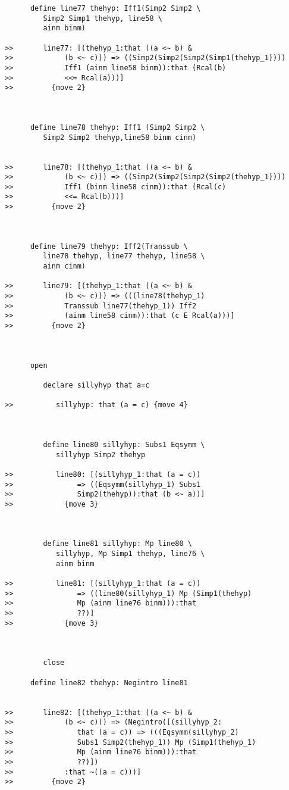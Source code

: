 \documentclass[12pt]{article}
\begin{document}
\begin{verbatim}
      define line77 thehyp: Iff1(Simp2 Simp2 \
         Simp2 Simp1 thehyp, line58 \
         ainm binm)

>>       line77: [(thehyp_1:that ((a <~ b) &
>>            (b <~ c))) => ((Simp2(Simp2(Simp2(Simp1(thehyp_1))))
>>            Iff1 (ainm line58 binm)):that (Rcal(b)
>>            <<= Rcal(a)))]
>>         {move 2}



      define line78 thehyp: Iff1 (Simp2 Simp2 \
         Simp2 Simp2 thehyp,line58 binm cinm)


>>       line78: [(thehyp_1:that ((a <~ b) &
>>            (b <~ c))) => ((Simp2(Simp2(Simp2(Simp2(thehyp_1))))
>>            Iff1 (binm line58 cinm)):that (Rcal(c)
>>            <<= Rcal(b)))]
>>         {move 2}



      define line79 thehyp: Iff2(Transsub \
         line78 thehyp, line77 thehyp, line58 \
         ainm cinm)

>>       line79: [(thehyp_1:that ((a <~ b) &
>>            (b <~ c))) => (((line78(thehyp_1)
>>            Transsub line77(thehyp_1)) Iff2
>>            (ainm line58 cinm)):that (c E Rcal(a)))]
>>         {move 2}



      open

         declare sillyhyp that a=c

>>          sillyhyp: that (a = c) {move 4}



         define line80 sillyhyp: Subs1 Eqsymm \
            sillyhyp Simp2 thehyp

>>          line80: [(sillyhyp_1:that (a = c))
>>               => ((Eqsymm(sillyhyp_1) Subs1
>>               Simp2(thehyp)):that (b <~ a))]
>>            {move 3}



         define line81 sillyhyp: Mp line80 \
            sillyhyp, Mp Simp1 thehyp, line76 \
            ainm binm

>>          line81: [(sillyhyp_1:that (a = c))
>>               => ((line80(sillyhyp_1) Mp (Simp1(thehyp)
>>               Mp (ainm line76 binm))):that
>>               ??)]
>>            {move 3}



         close

      define line82 thehyp: Negintro line81


>>       line82: [(thehyp_1:that ((a <~ b) &
>>            (b <~ c))) => (Negintro([(sillyhyp_2:
>>               that (a = c)) => (((Eqsymm(sillyhyp_2)
>>               Subs1 Simp2(thehyp_1)) Mp (Simp1(thehyp_1)
>>               Mp (ainm line76 binm))):that
>>               ??)])
>>            :that ~((a = c)))]
>>         {move 2}




\end{verbatim}
\end{document}
